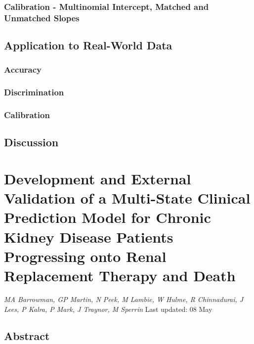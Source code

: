 \documentclass[12pt,PhD,twoside,openright]{muthesis}
\begin{document}
\hypertarget{calibration---multinomial-intercept-matched-and-unmatched-slopes}{%
\subsection{Calibration - Multinomial Intercept, Matched and Unmatched Slopes}\label{calibration---multinomial-intercept-matched-and-unmatched-slopes}}

\hypertarget{application-to-real-world-data}{%
\section{Application to Real-World Data}\label{application-to-real-world-data}}

\hypertarget{accuracy}{%
\subsection{Accuracy}\label{accuracy}}

\hypertarget{discrimination}{%
\subsection{Discrimination}\label{discrimination}}

\hypertarget{calibration}{%
\subsection{Calibration}\label{calibration}}

\hypertarget{discussion-3}{%
\section{Discussion}\label{discussion-3}}

\hypertarget{chap-dev-paper}{%
\chapter{Development and External Validation of a Multi-State Clinical Prediction Model for Chronic Kidney Disease Patients Progressing onto Renal Replacement Therapy and Death}\label{chap-dev-paper}}

\emph{MA Barrowman, GP Martin, N Peek, M Lambie, W Hulme, R Chinnadurai, J Lees, P Kalra, P Mark, J Traynor, M Sperrin}
Last updated: 08 May

\hypertarget{abstract-2}{%
\section*{Abstract}\label{abstract-2}}
\end{document}
